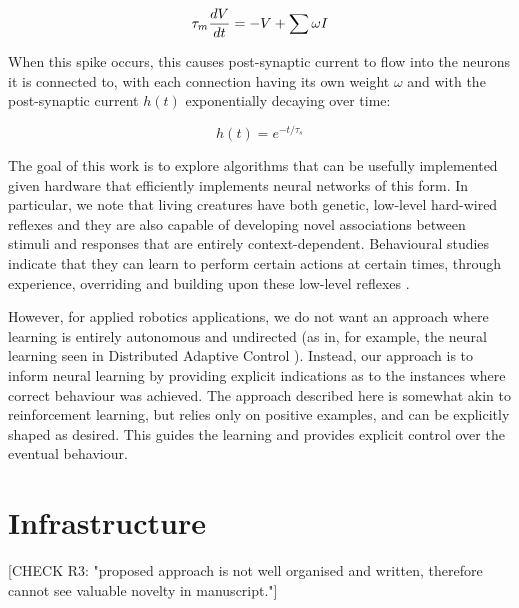 \documentclass[conference]{IEEEtran}
\begin{document}
\begin{equation}
    \tau_m {dV \over dt} = -V + \sum \omega I
\end{equation}

When this spike occurs, this causes post-synaptic current to flow into the 
neurons it is connected to, with each connection having its own weight $\omega$
and with the post-synaptic current $h(t)$ exponentially decaying over time:

\begin{equation}
    h(t) = e^{-t/\tau_s}
\end{equation}

The goal of this work is to explore algorithms that can be usefully implemented
given hardware that efficiently implements neural networks of this form.  In
particular, we note that living creatures have both genetic, low-level 
hard-wired reflexes and they are also capable of developing novel associations 
between stimuli and responses that are entirely context-dependent. Behavioural 
studies indicate that they can learn to perform certain actions at certain 
times, through experience, overriding and building upon these low-level 
reflexes \cite{kim2007encoding}. 

However, for applied robotics applications, we do not want an approach where
learning is entirely autonomous and undirected (as in, for example, the neural
learning seen in Distributed Adaptive Control \cite{verschure2012distributed}). 
Instead, our approach is to inform neural learning by providing explicit
indications as to the instances where correct behaviour was achieved.  The 
approach described here is somewhat akin to reinforcement learning, but relies
only on positive examples, and can be explicitly shaped as desired.  This 
guides the learning and provides explicit control over the eventual behaviour. 

\section{Infrastructure}
\label{infrastructure}

[CHECK R3: "proposed approach is not well organised and written, therefore cannot see valuable novelty in manuscript."]
\end{document}

